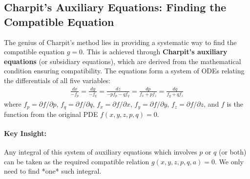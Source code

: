 \documentclass{article}
\theoremstyle{remark}
\begin{document}
	\subsection{Charpit's Auxiliary Equations: Finding the Compatible Equation}
	The genius of Charpit's method lies in providing a systematic way to find the compatible equation $g=0$. This is achieved through \textbf{Charpit's auxiliary equations} (or subsidiary equations), which are derived from the mathematical condition ensuring compatibility. The equations form a system of ODEs relating the differentials of all five variables:
	\begin{align} \label{eq:charpit_ae_main_detailed}
		\frac{dx}{-f_p} = \frac{dy}{-f_q} = \frac{dz}{-p f_p - q f_q} = \frac{dp}{f_x + p f_z} = \frac{dq}{f_y + q f_z}
	\end{align}
	where $f_p = \partial f/\partial p$, $f_q = \partial f/\partial q$, $f_x = \partial f/\partial x$, $f_y = \partial f/\partial y$, $f_z = \partial f/\partial z$, and $f$ is the function from the original PDE $f(x, y, z, p, q) = 0$.
	
	\paragraph{Key Insight:} Any integral of this system of auxiliary equations which involves $p$ or $q$ (or both) can be taken as the required compatible relation $g(x, y, z, p, q, a) = 0$. We only need to find *one* such integral.
	
\end{document}
